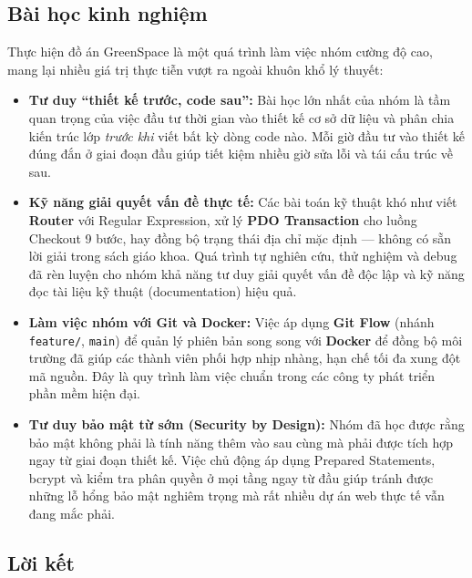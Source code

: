 \documentclass[11pt, a4paper]{article}
\begin{document}
\subsection{Bài học kinh nghiệm}

Thực hiện đồ án GreenSpace là một quá trình làm việc nhóm cường độ cao,
mang lại nhiều giá trị thực tiễn vượt ra ngoài khuôn khổ lý thuyết:

\begin{itemize}[leftmargin=*]
    \item \textbf{Tư duy ``thiết kế trước, code sau'':}
    Bài học lớn nhất của nhóm là tầm quan trọng của việc đầu tư thời gian
    vào thiết kế cơ sở dữ liệu và phân chia kiến trúc lớp \textit{trước khi}
    viết bất kỳ dòng code nào. Mỗi giờ đầu tư vào thiết kế đúng đắn ở giai
    đoạn đầu giúp tiết kiệm nhiều giờ sửa lỗi và tái cấu trúc về sau.

    \item \textbf{Kỹ năng giải quyết vấn đề thực tế:}
    Các bài toán kỹ thuật khó như viết \textbf{Router} với Regular Expression,
    xử lý \textbf{PDO Transaction} cho luồng Checkout 9 bước, hay đồng bộ
    trạng thái địa chỉ mặc định --- không có sẵn lời giải trong sách giáo
    khoa. Quá trình tự nghiên cứu, thử nghiệm và debug đã rèn luyện cho nhóm
    khả năng tư duy giải quyết vấn đề độc lập và kỹ năng đọc tài liệu kỹ
    thuật (documentation) hiệu quả.

    \item \textbf{Làm việc nhóm với Git và Docker:}
    Việc áp dụng \textbf{Git Flow} (nhánh \texttt{feature/}, \texttt{main})
    để quản lý phiên bản song song với \textbf{Docker} để đồng bộ môi trường
    đã giúp các thành viên phối hợp nhịp nhàng, hạn chế tối đa xung đột mã
    nguồn. Đây là quy trình làm việc chuẩn trong các công ty phát triển phần
    mềm hiện đại.

    \item \textbf{Tư duy bảo mật từ sớm (Security by Design):}
    Nhóm đã học được rằng bảo mật không phải là tính năng thêm vào sau cùng
    mà phải được tích hợp ngay từ giai đoạn thiết kế. Việc chủ động áp dụng
    Prepared Statements, bcrypt và kiểm tra phân quyền ở mọi tầng ngay từ
    đầu giúp tránh được những lỗ hổng bảo mật nghiêm trọng mà rất nhiều dự
    án web thực tế vẫn đang mắc phải.
\end{itemize}

\subsection{Lời kết}
\end{document}
